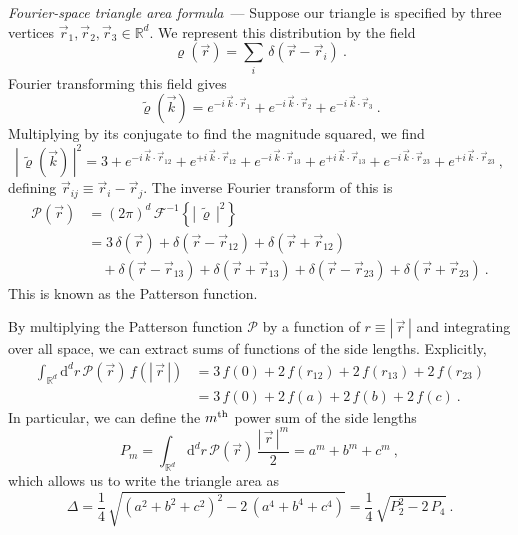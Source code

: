 \documentclass[10pt]{article}
\renewcommand{\paragraph}[1]{\par\addvspace{1em}\noindent\textsl{#1}~---}
\renewcommand{\d}{\mathrm{d}}
\newcommand{\abs}[1]{|\,{#1}\,|}
\begin{document}
\paragraph{Fourier-space triangle area formula}
Suppose our triangle is specified by three vertices $\vec{r}_1,\vec{r}_2,\vec{r}_3 \in \mathbb{R}^d$. We represent this distribution by the field
\begin{equation}
    \varrho(\vec{r})
    = \sum_i \, \delta(\vec{r} - \vec{r}_i)~.
\end{equation}
Fourier transforming this field gives
\begin{equation}
    \tilde{\varrho}(\vec{k})
    =
    e^{-i \, \vec{k} \cdot \vec{r}_1} +
    e^{-i \, \vec{k} \cdot \vec{r}_2} +
    e^{-i \, \vec{k} \cdot \vec{r}_3}~.
\end{equation}
Multiplying by its conjugate to find the magnitude squared, we find
\begin{equation}
    \abs{\tilde{\varrho}(\vec{k})}^2
    =
    3 +
    e^{-i \, \vec{k} \cdot \vec{r}_{12}} +
    e^{+i \, \vec{k} \cdot \vec{r}_{12}} +
    e^{-i \, \vec{k} \cdot \vec{r}_{13}} +
    e^{+i \, \vec{k} \cdot \vec{r}_{13}} +
    e^{-i \, \vec{k} \cdot \vec{r}_{23}} +
    e^{+i \, \vec{k} \cdot \vec{r}_{23}}~,
\end{equation}
defining $\vec{r}_{ij} \equiv \vec{r}_i - \vec{r}_j$.
The inverse Fourier transform of this is
\begin{align}
    \mathcal{P}(\vec{r})
    &= (2\pi)^d \, \mathcal{F}^{-1} \! \left\{ \abs{\tilde{\varrho}}^2 \right\}
    \nonumber\\ 
    &= 3 \,\delta(\vec{r})
    + \delta(\vec{r} - \vec{r}_{12})
    + \delta(\vec{r} + \vec{r}_{12})
    \nonumber\\
    &\quad + \delta(\vec{r} - \vec{r}_{13})
    + \delta(\vec{r} + \vec{r}_{13})
    + \delta(\vec{r} - \vec{r}_{23})
    + \delta(\vec{r} + \vec{r}_{23})~.
\end{align}
This is known as the Patterson function.

By multiplying the Patterson function $\mathcal{P}$ by a function of $r \equiv \abs{\vec{r}}$ and integrating over all space, we can extract sums of functions of the side lengths. Explicitly,
\begin{align}
    \int_{\mathbb{R}^d} \d^d r \, \mathcal{P}(\vec{r}) \, f(\abs{\vec{r}})
    &= 3 \, f(0) +
        2 \, f(r_{12}) +
        2 \, f(r_{13}) +
        2 \, f(r_{23}) \nonumber\\
    &= 3 \, f(0) +
        2 \, f(a) +
        2 \, f(b) +
        2 \, f(c)~.
\end{align}
In particular, we can define the $m^{\rm th}$ power sum of the side lengths
\begin{equation}
    P_m
    = \int_{\mathbb{R}^d} \d^d r \, \mathcal{P}(\vec{r}) \, \frac{\abs{\vec{r}}^m}{2}
    = a^m + b^m + c^m~,
\end{equation}
which allows us to write the triangle area as
\begin{equation}
    \Delta
    = \frac{1}{4} \, \sqrt{\left(a^2+b^2+c^2\right)^2 - 2\, \left(a^4+b^4+c^4\right)}
    = \frac{1}{4} \, \sqrt{P_2^2 - 2\, P_4}~.
\end{equation}
\end{document}
